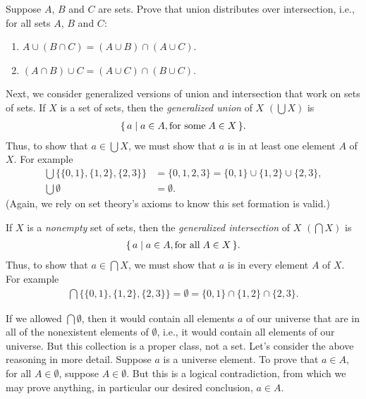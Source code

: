 \begin{exercise}
Suppose $A$, $B$ and $C$ are sets.  Prove that union distributes over
intersection, i.e., for all sets $A$, $B$ and $C$:
\begin{enumerate}[\quad(1)]
\item $A\cup(B\cap C)=(A\cup B)\cap(A\cup C)$.

\item $(A\cap B)\cup C=(A\cup C)\cap(B\cup C)$.
\end{enumerate}
\end{exercise}

Next, we consider generalized versions of union and intersection that
work on sets of sets.  If $X$ is a set of sets, then the
\emph{generalized union}
%
%
of $X$ $(\bigcup X)$
%
%
is
\begin{gather*}
\{ \, a \mid a\in A,\allowbreak\mbox{for some}\allowbreak\;A\in X \, \} .
\end{gather*}
Thus, to show that $a\in\bigcup X$, we must show that $a$ is in at
least one element $A$ of $X$.  For example
\begin{align*}
\bigcup\{\{0,1\},\{1,2\},\{2,3\}\} &=
\{0,1,2,3\}=\{0,1\}\cup\{1,2\}\cup\{2,3\}, \\
\bigcup\emptyset &= \emptyset.
\end{align*}
(Again, we rely on set theory's axioms to know this set formation
is valid.)

If $X$ is a \emph{nonempty} set of sets, then the \emph{generalized
intersection}
%
%
of $X$ $(\bigcap X)$
%
%
is
\begin{gather*}
\{ \, a \mid a\in A,\allowbreak\mbox{for all}\allowbreak\;A\in X \, \} .
\end{gather*}
Thus, to show that $a\in\bigcap X$, we must show that
$a$ is in every element $A$ of $X$.
For example
\begin{gather*}
\bigcap\{\{0,1\},\{1,2\},\{2,3\}\} =
\emptyset=\{0,1\}\cap\{1,2\}\cap\{2,3\} .
\end{gather*}

If we allowed $\bigcap\emptyset$, then it would contain all elements
$a$ of our universe that are in all of the nonexistent elements of
$\emptyset$, i.e., it would contain all elements of our universe. But
this collection is a proper class, not a set. Let's consider the above
reasoning in more detail.  Suppose $a$ is a universe element. To prove
that $a\in A$, for all $A\in\emptyset$, suppose $A\in\emptyset$. But this is
a logical contradiction, from which we may prove anything, in particular our
%
%
desired conclusion, $a\in A$.

